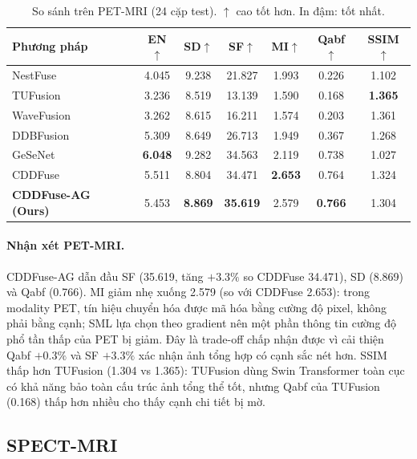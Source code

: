 \begin{table}[H]
\centering
\small
\caption[So sánh với SOTA trên PET-MRI (24 cặp test)]{So sánh trên PET-MRI (24 cặp test). $\uparrow$ cao tốt hơn. In đậm: tốt nhất.}
\label{tab:sota-pet}
\setlength{\tabcolsep}{4pt}
\begin{tabular}{lcccccc}
\toprule
\textbf{Phương pháp} & \textbf{EN}$\uparrow$ & \textbf{SD}$\uparrow$ & \textbf{SF}$\uparrow$ & \textbf{MI}$\uparrow$ & \textbf{Qabf}$\uparrow$ & \textbf{SSIM}$\uparrow$ \\
\midrule
NestFuse~\cite{li2020nestfuse}   & 4.045 & 9.238 & 21.827 & 1.993 & 0.226 & 1.102 \\
TUFusion~\cite{zhao2024tufusion} & 3.236 & 8.519 & 13.139 & 1.590 & 0.168 & \textbf{1.365} \\
WaveFusion~\cite{wang2025wavefusion} & 3.262 & 8.615 & 16.211 & 1.574 & 0.203 & 1.361 \\
DDBFusion~\cite{zhang2025ddbfusion}  & 5.309 & 8.649 & 26.713 & 1.949 & 0.367 & 1.268 \\
GeSeNet~\cite{li2023gesenet}    & \textbf{6.048} & 9.282 & 34.563 & 2.119 & 0.738 & 1.027 \\
CDDFuse~\cite{zhao2023cddfuse}  & 5.511 & 8.804 & 34.471 & \textbf{2.653} & 0.764 & 1.324 \\
\midrule
\textbf{CDDFuse-AG (Ours)} & 5.453 & \textbf{8.869} & \textbf{35.619} & 2.579 & \textbf{0.766} & 1.304 \\
\bottomrule
\end{tabular}
\end{table}

\paragraph{Nhận xét PET-MRI.}
CDDFuse-AG dẫn đầu SF (35.619, tăng $+3.3\%$ so CDDFuse 34.471), SD (8.869) và Qabf (0.766). MI giảm nhẹ xuống 2.579 (so với CDDFuse 2.653): trong modality PET, tín hiệu chuyển hóa được mã hóa bằng cường độ pixel, không phải bằng cạnh; SML lựa chọn theo gradient nên một phần thông tin cường độ phổ tần thấp của PET bị giảm. Đây là trade-off chấp nhận được vì cải thiện Qabf $+0.3\%$ và SF $+3.3\%$ xác nhận ảnh tổng hợp có cạnh sắc nét hơn. SSIM thấp hơn TUFusion (1.304 vs 1.365): TUFusion dùng Swin Transformer toàn cục có khả năng bảo toàn cấu trúc ảnh tổng thể tốt, nhưng Qabf của TUFusion (0.168) thấp hơn nhiều cho thấy cạnh chi tiết bị mờ.

\subsection{SPECT-MRI}

